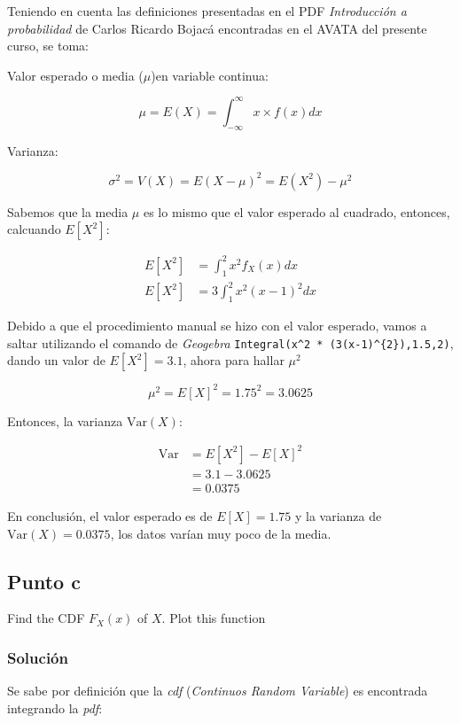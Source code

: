\documentclass[12pt]{article}
\begin{document}
Teniendo en cuenta las definiciones presentadas en el PDF \textit{Introducción a probabilidad} de Carlos Ricardo Bojacá encontradas en el AVATA del presente curso, se toma:

Valor esperado o media ($\mu$)en variable continua:

\[
\mu = E(X) = \int_{-\infty}^{\infty} x \times f(x) dx
\]

Varianza:

\[
\sigma^{2} = V(X) = E(X - \mu)^{2} = E(X^{2}) - \mu^{2}
\]

Sabemos que la media $\mu$ es lo mismo que el valor esperado al cuadrado, entonces, calcuando $E[X^{2}]$:

\begin{align*}
  E[X^{2}] &= \int_{1}^{2} x^{2} f_{X} (x) dx \\
  E[X^{2}] &= 3 \int_{1}^{2} x^{2} (x-1)^{2} dx
\end{align*}

Debido a que el procedimiento manual se hizo con el valor esperado, vamos a saltar utilizando el comando de \textit{Geogebra} \lstinline|Integral(x^2 * (3(x-1)^{2}),1.5,2)|, dando un valor de $E[X^{2}] = 3.1$, ahora para hallar $\mu^{2}$

\[
\mu^{2} = E[X]^{2} = 1.75^{2} = 3.0625
\]

Entonces, la varianza $\mathrm{Var}(X)$:

\begin{align*}
  \mathrm{Var} &= E[X^{2}] - E[X]^{2} \\
               &= 3.1 - 3.0625 \\
               &= 0.0375
\end{align*}

En conclusión, el valor esperado es de $E[X] = 1.75$ y la varianza de $\mathrm{Var}(X) = 0.0375$, los datos varían muy poco de la media.

\subsection{Punto c}

Find the CDF $F_{X}(x)$ of $X$. Plot this function

\subsubsection{Solución}

Se sabe por definición que la \textit{cdf} (\textit{Continuos Random Variable}) es encontrada integrando la \textit{pdf}:
\end{document}
